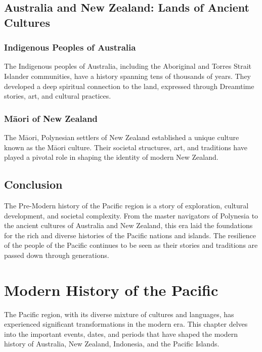 \documentclass[a4paper,12pt]{book}
\begin{document}
\section{Australia and New Zealand: Lands of Ancient Cultures}
\label{sec:australia-new-zealand}

\subsection{Indigenous Peoples of Australia}
\label{subsec:australia-indigenous-peoples}

The Indigenous peoples of Australia, including the Aboriginal and Torres Strait Islander communities, have a history spanning tens of thousands of years. They developed a deep spiritual connection to the land, expressed through Dreamtime stories, art, and cultural practices.

\subsection{Māori of New Zealand}
\label{subsec:maori-new-zealand}

The Māori, Polynesian settlers of New Zealand established a unique culture known as the Māori culture. Their societal structures, art, and traditions have played a pivotal role in shaping the identity of modern New Zealand.

\section{Conclusion}
\label{sec:conclusion-pre-modern-pacific}

The Pre-Modern history of the Pacific region is a story of exploration, cultural development, and societal complexity. From the master navigators of Polynesia to the ancient cultures of Australia and New Zealand, this era laid the foundations for the rich and diverse histories of the Pacific nations and islands. The resilience of the people of the Pacific continues to be seen as their stories and traditions are passed down through generations.

\chapter{Modern History of the Pacific}
\label{ch:modern-pacific-history}

The Pacific region, with its diverse mixture of cultures and languages, has experienced significant transformations in the modern era. This chapter delves into the important events, dates, and periods that have shaped the modern history of Australia, New Zealand, Indonesia, and the Pacific Islands.
\end{document}
